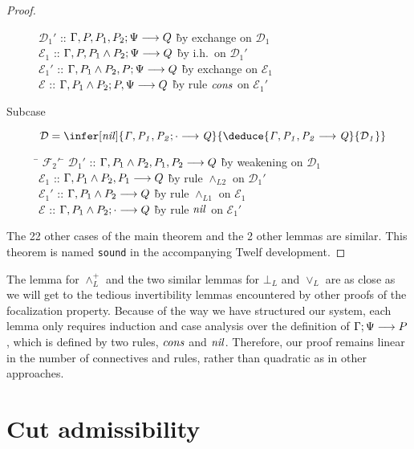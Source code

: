 \documentclass[acmtocl]{robtrans}\pdfoutput=1
\newcommand{\seq}[2]{{#1} \longrightarrow {#2} \mathstrut}
\begin{document}
\begin{proof}
\begin{description}
\begin{tabbing}
\>
$\mathcal D_1'$ \> :: $\seq{\Gamma, P, P_1, P_2; \Psi}{Q}$
 \` by exchange on $\mathcal D_1$\\
\>
$\mathcal E_1$ \> :: $\seq{\Gamma, P, P_1 \wedge P_2; \Psi}{Q}$
 \` by i.h.~on $\mathcal D_1'$\\
\>
$\mathcal E_1'$ \> :: $\seq{\Gamma, P_1 \wedge P_2, P; \Psi}{Q}$
 \` by exchange on $\mathcal E_1$\\
\>
$\mathcal E$ \> :: $\seq{\Gamma, P_1 \wedge P_2; P, \Psi}{Q}$
 \` by rule $\it cons$ on $\mathcal E_1'$
\end{tabbing}
\item[Subcase] $\mathcal D = 
\infer[\it nil]
{\seq{\Gamma, P_1, P_2; \cdot}{Q}}
{\deduce{\seq{\Gamma, P_1, P_2}{Q}}{\mathcal D_1}}$
\begin{tabbing}
\qquad \= $\mathcal F_2'$ \= \kill
\>
$\mathcal D_1'$ \> :: $\seq{\Gamma, P_1 \wedge P_2, P_1, P_2}{Q}$
 \` by weakening on $\mathcal D_1$\\
\>
$\mathcal E_1$ \> :: $\seq{\Gamma, P_1 \wedge P_2, P_1}{Q}$
 \` by rule $\wedge_{L2}$ on $\mathcal D_1'$\\
\>
$\mathcal E_1'$ \> :: $\seq{\Gamma, P_1 \wedge P_2}{Q}$
 \` by rule $\wedge_{L1}$ on $\mathcal E_1$\\
\>
$\mathcal E$ \> :: $\seq{\Gamma, P_1 \wedge P_2; \cdot}{Q}$
 \` by rule $\it nil$ on $\mathcal E_1'$
\end{tabbing}
\end{description}
The 22 other cases of the main theorem and the 2 other lemmas are
similar.  This theorem is named {\tt sound} in the accompanying Twelf
development.
\end{proof}

The lemma for $\wedge^+_L$ and the two similar lemmas for $\bot_L$ and
$\vee_L$ are as close as we will get to the tedious invertibility
lemmas encountered by other proofs of the focalization property.
Because of the way we have structured our system, each lemma only
requires induction and case analysis over the definition of
$\seq{\Gamma; \Psi}{P}$, which is defined by two rules, ${\it cons}$
and ${\it nil}$. Therefore, our proof remains linear in the number of
connectives and rules, rather than quadratic as in other approaches.

\section{Cut admissibility}
\label{sec:cut}
\end{document}
